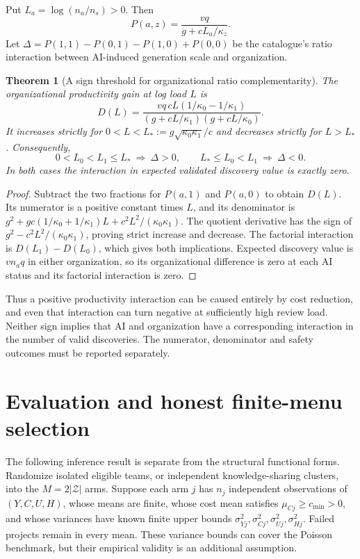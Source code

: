 \documentclass[11pt,a4paper]{article}
\newtheorem{theorem}{Theorem}[section]
\theoremstyle{definition}
\theoremstyle{remark}
\begin{document}
Put $L_a=\log(n_a/n_s)>0$. Then
\[
 P(a,z)=\frac{vq}{g+cL_a/\kappa_z}.
\]
Let $\Delta=P(1,1)-P(0,1)-P(1,0)+P(0,0)$ be the catalogue's ratio interaction between AI-induced generation scale and organization.

\begin{theorem}[A sign threshold for organizational ratio complementarity]\label{th:interaction}
The organizational productivity gain at log load $L$ is
\[
 D(L)=\frac{vq\,cL(1/\kappa_0-1/\kappa_1)}
 {(g+cL/\kappa_1)(g+cL/\kappa_0)}.
\]
It increases strictly for $0<L<L_*:=g\sqrt{\kappa_0\kappa_1}/c$ and decreases strictly for $L>L_*$. Consequently,
\[
 0<L_0<L_1\leq L_*\ \Longrightarrow\ \Delta>0,
 \qquad
 L_*\leq L_0<L_1\ \Longrightarrow\ \Delta<0.
\]
In both cases the interaction in expected validated discovery value is exactly zero.
\end{theorem}
\begin{proof}
Subtract the two fractions for $P(a,1)$ and $P(a,0)$ to obtain $D(L)$. Its numerator is a positive constant times $L$, and its denominator is
$g^2+gc(1/\kappa_0+1/\kappa_1)L+c^2L^2/(\kappa_0\kappa_1)$.
The quotient derivative has the sign of
$g^2-c^2L^2/(\kappa_0\kappa_1)$, proving strict increase and decrease. The factorial interaction is $D(L_1)-D(L_0)$, which gives both implications. Expected discovery value is $vn_aq$ in either organization, so its organizational difference is zero at each AI status and its factorial interaction is zero.
\end{proof}

Thus a positive productivity interaction can be caused entirely by cost reduction, and even that interaction can turn negative at sufficiently high review load. Neither sign implies that AI and organization have a corresponding interaction in the number of valid discoveries. The numerator, denominator and safety outcomes must be reported separately.

\section{Evaluation and honest finite-menu selection}
The following inference result is separate from the structural functional forms. Randomize isolated eligible teams, or independent knowledge-sharing clusters, into the $M=2|\mathcal Z|$ arms. Suppose each arm $j$ has $n_j$ independent observations of $(Y,C,U,H)$, whose means are finite, whose cost mean satisfies $\mu_{Cj}\geq c_{\min}>0$, and whose variances have known finite upper bounds $\sigma_{Yj}^2,\sigma_{Cj}^2,\sigma_{Uj}^2,\sigma_{Hj}^2$. Failed projects remain in every mean. These variance bounds can cover the Poisson benchmark, but their empirical validity is an additional assumption.
\end{document}
